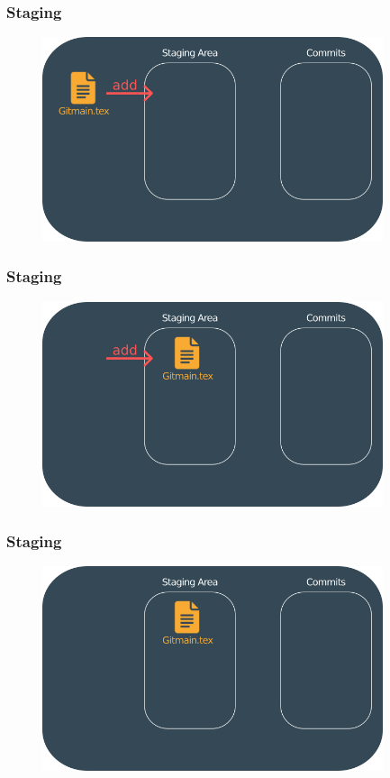 \documentclass{beamer}
\begin{document}
	\begin{frame}
		\frametitle{Staging}
		\begin{figure}[htbp]
			\centering
			\includegraphics[width=10cm]{staging3}
		\end{figure}
	\end{frame}
	
	\begin{frame}
		\frametitle{Staging}
		\begin{figure}[htbp]
			\centering
			\includegraphics[width=10cm]{staging4}
		\end{figure}
	\end{frame}
	
	\begin{frame}
		\frametitle{Staging}
		\begin{figure}[htbp]
			\centering
			\includegraphics[width=10cm]{staging5}
		\end{figure}
	\end{frame}
	
\end{document}
